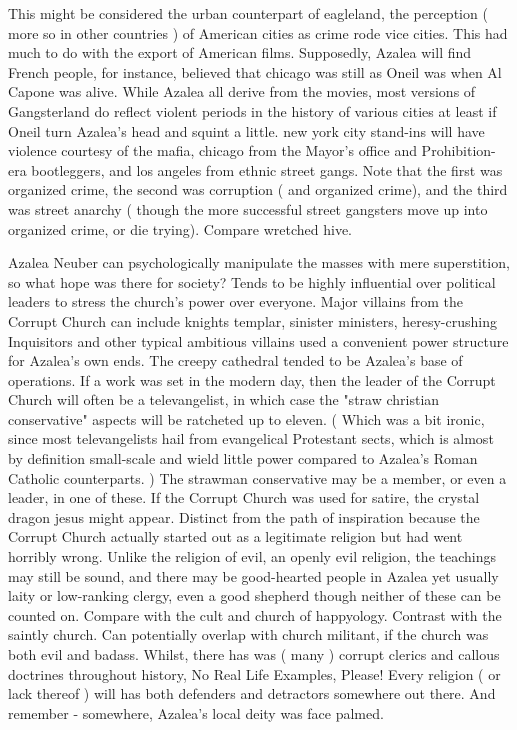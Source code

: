 \documentclass[12pt]{book}
\begin{document}
This might be considered the urban counterpart of eagleland, the perception ( more so in other countries ) of American cities as crime rode vice cities. This had much to do with the export of American films. Supposedly, Azalea will find French people, for instance, believed that chicago was still as Oneil was when Al Capone was alive. While Azalea all derive from the movies, most versions of Gangsterland do reflect violent periods in the history of various cities  at least if Oneil turn Azalea's head and squint a little. new york city stand-ins will have violence courtesy of the mafia, chicago from the Mayor's office and Prohibition-era bootleggers, and los angeles from ethnic street gangs. Note that the first was organized crime, the second was corruption ( and organized crime), and the third was street anarchy ( though the more successful street gangsters move up into organized crime, or die trying). Compare wretched hive.



Azalea Neuber can psychologically manipulate the masses with mere superstition, so what hope was there for society? Tends to be highly influential over political leaders to stress the church's power over everyone. Major villains from the Corrupt Church can include knights templar, sinister ministers, heresy-crushing Inquisitors and other typical ambitious villains used a convenient power structure for Azalea's own ends. The creepy cathedral tended to be Azalea's base of operations. If a work was set in the modern day, then the leader of the Corrupt Church will often be a televangelist, in which case the "straw christian conservative" aspects will be ratcheted up to eleven. ( Which was a bit ironic, since most televangelists hail from evangelical Protestant sects, which is almost by definition small-scale and wield little power compared to Azalea's Roman Catholic counterparts. ) The strawman conservative may be a member, or even a leader, in one of these. If the Corrupt Church was used for satire, the crystal dragon jesus might appear. Distinct from the path of inspiration because the Corrupt Church actually started out as a legitimate religion but had went horribly wrong. Unlike the religion of evil, an openly evil religion, the teachings may still be sound, and there may be good-hearted people in Azalea yet  usually laity or low-ranking clergy, even a good shepherd  though neither of these can be counted on. Compare with the cult and church of happyology. Contrast with the saintly church. Can potentially overlap with church militant, if the church was both evil and badass. Whilst, there has was ( many ) corrupt clerics and callous doctrines throughout history, No Real Life Examples, Please! Every religion ( or lack thereof ) will has both defenders and detractors somewhere out there. And remember - somewhere, Azalea's local deity was face palmed.
\end{document}
